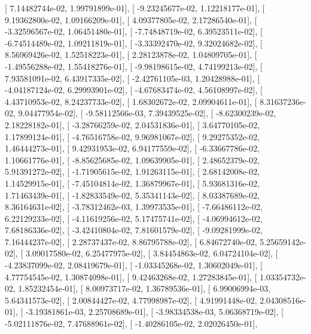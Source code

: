 \documentclass{article}
\begin{document}
       [  7.14482744e-02,   1.99791899e-01],
       [ -9.23245677e-02,   1.12218177e-01],
       [  9.19362800e-02,   1.09166209e-01],
       [  4.09377805e-02,   2.17286540e-01],
       [ -3.32596567e-02,   1.06451480e-01],
       [ -7.74848719e-02,   6.39523511e-02],
       [ -6.74514489e-02,   1.09211819e-01],
       [ -3.33392470e-02,   9.32024682e-02],
       [  8.56969426e-02,   1.52518223e-01],
       [  2.28123878e-02,   1.04809705e-01],
       [ -1.49556288e-02,   1.55418276e-01],
       [ -9.98198615e-02,   4.74199213e-02],
       [  7.93581091e-02,   6.43917335e-02],
       [ -2.42761105e-03,   1.20428988e-01],
       [ -4.04187124e-02,   6.29993901e-02],
       [ -4.67683474e-02,   4.56108997e-02],
       [  4.43710953e-02,   8.24237733e-02],
       [  1.68302672e-02,   2.09904611e-01],
       [  8.31637236e-02,   9.04477954e-02],
       [ -9.58112566e-03,   7.39439525e-02],
       [ -8.62300239e-02,   2.18228182e-01],
       [ -3.28766259e-02,   2.04531836e-01],
       [  3.64770105e-02,   1.17899124e-01],
       [ -4.76516758e-02,   9.96981067e-02],
       [  9.29275352e-02,   1.46444273e-01],
       [  9.42931953e-02,   6.94177559e-02],
       [ -6.33667786e-02,   1.10661776e-01],
       [ -8.85625685e-02,   1.09639905e-01],
       [  2.48652379e-02,   5.91391272e-02],
       [ -1.71905615e-02,   1.91263115e-01],
       [  2.68142008e-02,   1.14529915e-01],
       [ -7.45104814e-02,   1.36879967e-01],
       [  5.93681316e-02,   1.71463439e-01],
       [ -1.82833549e-02,   5.35341143e-02],
       [  8.03387689e-02,   8.36164631e-02],
       [ -3.78312462e-03,   1.39973535e-01],
       [ -7.66486112e-02,   6.22129233e-02],
       [ -4.11619256e-02,   5.17475741e-02],
       [ -4.06994612e-02,   7.68186336e-02],
       [ -3.42410804e-02,   7.81601579e-02],
       [ -9.09281999e-02,   7.16444237e-02],
       [  2.28737437e-02,   8.86795788e-02],
       [  6.84672740e-02,   5.25659142e-02],
       [  3.09017580e-02,   6.25477975e-02],
       [  3.84454863e-02,   6.04724104e-02],
       [ -4.23837099e-02,   2.08419679e-01],
       [ -1.03345268e-02,   1.30602049e-01],
       [  4.77754545e-02,   1.30874098e-01],
       [  9.42463268e-02,   1.27283845e-01],
       [  1.03354732e-02,   1.85232454e-01],
       [  8.00973717e-02,   1.36789536e-01],
       [  6.99006994e-03,   5.64341573e-02],
       [  2.00844427e-02,   4.77998987e-02],
       [  4.91991448e-02,   2.04308516e-01],
       [ -3.19381861e-03,   2.25708689e-01],
       [ -3.98334538e-03,   5.06368719e-02],
       [ -5.02111876e-02,   7.47688961e-02],
       [ -1.40286105e-02,   2.02026450e-01],
\end{document}
